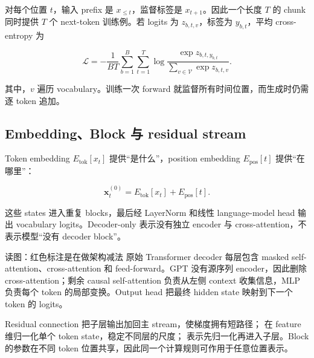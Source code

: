 
对每个位置 $t$，输入 prefix 是 $x_{\le t}$，监督标签是 $x_{t+1}$。因此一个长度 $T$ 的 chunk 同时提供 $T$ 个 next-token 训练例。若 logits 为 $z_{b,t,v}$，标签为 $y_{b,t}$，平均 cross-entropy 为

\[
\mathcal L=-\frac{1}{BT}\sum_{b=1}^{B}\sum_{t=1}^{T}
\log\frac{\exp z_{b,t,y_{b,t}}}{\sum_{v\in\mathcal V}\exp z_{b,t,v}}.
\]

其中，$v$ 遍历 vocabulary。训练一次 forward 就监督所有时间位置，而生成时仍需逐 token 追加。

\subsection{Embedding、Block 与 residual stream}

Token embedding $E_{\text{tok}}[x_t]$ 提供“是什么”，position embedding $E_{\text{pos}}[t]$ 提供“在哪里”：

\[
\mathbf x_t^{(0)}=E_{\text{tok}}[x_t]+E_{\text{pos}}[t].
\]

这些 states 进入重复 blocks，最后经 LayerNorm 和线性 language-model head 输出 vocabulary logits。Decoder-only 表示没有独立 encoder 与 cross-attention，不表示模型“没有 decoder block”。


\begin{knowledgebox}{读图：红色标注是在做架构减法}
原始 Transformer decoder 每层包含 masked self-attention、cross-attention 和 feed-forward。GPT 没有源序列 encoder，因此删除 cross-attention；剩余 causal self-attention 负责从左侧 context 收集信息，MLP 负责每个 token 的局部变换。Output head 把最终 hidden state 映射到下一个 token 的 logits。
\end{knowledgebox}


Residual connection 把子层输出加回主 stream，使梯度拥有短路径； 在 feature 维归一化单个 token state，稳定不同层的尺度； 表示先归一化再进入子层。Block 的参数在不同 token 位置共享，因此同一个计算规则可作用于任意位置表示。

